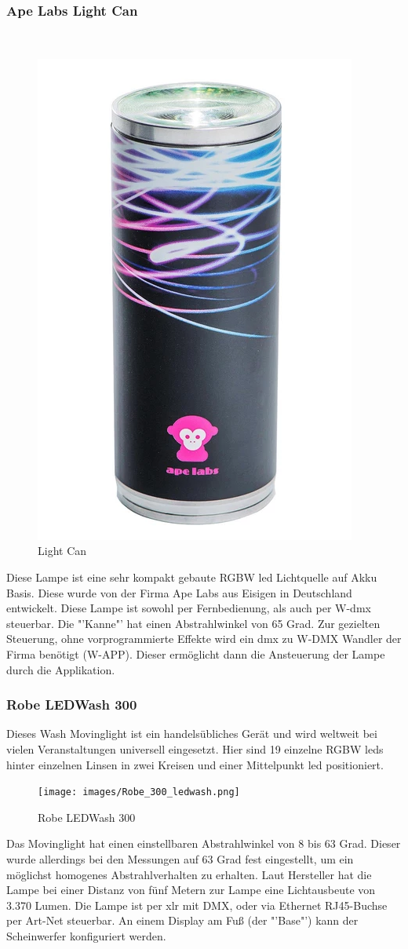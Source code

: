 \documentclass[11pt]{scrartcl}
\begin{document}
\subsubsection{Ape Labs Light Can}
~\par\vspace{-\baselineskip}
\begin{figure}
    \vspace{-45pt}
    \begin{center}
        \includegraphics[width=.23\textwidth]{images/light_can_front.png}
    \end{center}
    \vspace{-20pt}
    \begin{center}
        \caption{Light Can\\\cite{lightCan}}
    \end{center}
    \vspace{-15pt}
\end{figure}
\noindent
Diese Lampe ist eine sehr kompakt gebaute RGBW \ac{led} Lichtquelle auf Akku Basis. Diese wurde von der Firma Ape Labs aus Eisigen in Deutschland
entwickelt. Diese Lampe ist sowohl per Fernbedienung, als auch per W-\ac{dmx} steuerbar.
Die "'Kanne"' hat einen Abstrahlwinkel von 65 Grad. Zur gezielten Steuerung, ohne vorprogrammierte Effekte wird ein \ac{dmx} zu W-DMX Wandler der
Firma benötigt (W-APP). Dieser ermöglicht dann die Ansteuerung der Lampe durch die Applikation.
\subsubsection{Robe LEDWash 300}
Dieses Wash Movinglight ist ein handelsübliches Gerät und wird weltweit bei vielen Veranstaltungen universell eingesetzt. Hier sind 19 einzelne
RGBW \ac{led}s hinter einzelnen Linsen in zwei Kreisen und einer Mittelpunkt \ac{led} positioniert.
\begin{figure}[H]
    \begin{center}
        \texttt{[image: images/Robe\_300\_ledwash.png]}
    \end{center}
    \caption{Robe LEDWash 300 \cite{robe}}
\end{figure}
\noindent
Das Movinglight hat einen einstellbaren Abstrahlwinkel von 8 bis 63 Grad. Dieser wurde allerdings bei den Messungen auf 63 Grad fest eingestellt,
um ein möglichst homogenes Abstrahlverhalten zu erhalten. Laut Hersteller hat die Lampe bei einer Distanz von fünf Metern zur Lampe eine
Lichtausbeute von 3.370 Lumen. Die Lampe ist per \ac{xlr} mit DMX, oder via Ethernet RJ45-Buchse per Art-Net steuerbar. An einem Display
am Fuß (der "'Base"') kann der Scheinwerfer konfiguriert werden.
\end{document}
